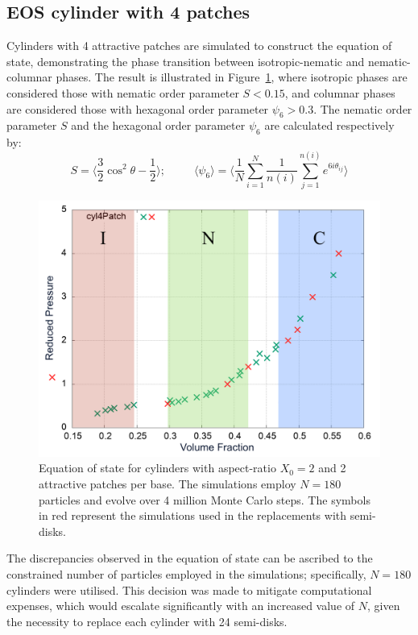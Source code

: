 \documentclass[aip,jcp, amsmath, amssymb, reprint]{revtex4-1}
\begin{document}
\subsection{EOS cylinder with 4 patches}
Cylinders with 4 attractive patches are simulated to construct the equation of state, demonstrating the phase transition
between isotropic-nematic and nematic-columnar phases. The result is illustrated in Figure~\ref{fig:eos1}, where
isotropic phases are considered those with nematic order parameter $S<0.15$, and columnar phases are considered those
with hexagonal order parameter $\psi_6 > 0.3$. The nematic order parameter $S$ and the hexagonal order parameter $\psi_6
$ are calculated respectively by: 
\begin{equation}  
\label{pordnem}
S= \bigg\langle \frac{3}{2} \cos^2\theta - \frac{1}{2} \bigg\rangle; \; \; \; \; \; \; \; \; \; \langle \psi_6\rangle=\bigg\langle \frac{1}{N} \sum_{i=1}^N \frac{1}{n(i)} \sum_{j=1}^{n(i)}e^{6i\theta_{ij}} \bigg\rangle
\end{equation}


\begin{figure}[h!]
\includegraphics[width=0.86\linewidth]{eos.png}
\caption{\label{fig:eos1} Equation of state for cylinders with aspect-ratio $X_0=2$ and 2 attractive patches per base. The simulations employ $N = 180$ particles and evolve over 4 million Monte Carlo steps. The symbols in red represent the simulations used in the replacements with semi-disks.}
\end{figure}


The discrepancies observed in the equation of state can be ascribed to the constrained number of particles employed in the simulations; specifically, $N=180$ cylinders were utilised. This decision was made to mitigate computational expenses, which would escalate significantly with an increased value of $N$, given the necessity to replace each cylinder with 24 semi-disks.
\end{document}
